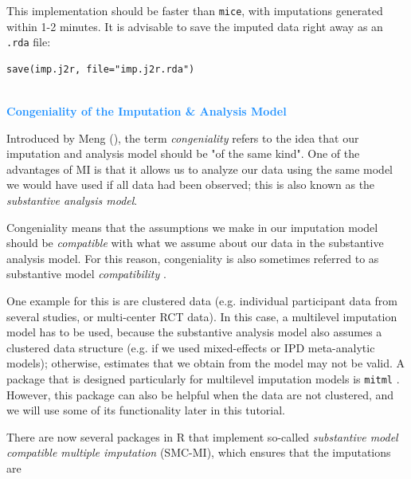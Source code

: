 This implementation should be faster than \texttt{mice}, with imputations generated within 1-2 minutes. It is advisable to save the imputed data right away as an \texttt{.rda} file:

\begin{lstlisting}
save(imp.j2r, file="imp.j2r.rda")
\end{lstlisting}

\begin{box-info} \\
\textcolor{dodgerblue}{\textbf{Congeniality of the Imputation \& Analysis Model}} 

\vspace{2mm}

Introduced by Meng (\citeyear{meng1994multiple}), the term \emph{congeniality} refers to the idea that our imputation and analysis model should be "of the same kind". One of the advantages of MI is that it allows us to analyze our data using the same model we would have used if all data had been observed; this is also known as the \emph{substantive analysis model}. 

\vspace{2mm}

\hspace*{5mm} Congeniality means that the assumptions we make in our imputation model should be \emph{compatible} with what we assume about our data in the substantive analysis model. For this reason, congeniality is also sometimes referred to as substantive model \emph{compatibility} \citep{bartlett2015multiple, quartagno2022substantive}. 

\vspace{2mm}

\hspace*{5mm} One example for this is are clustered data (e.g. individual participant data from several studies, or multi-center RCT data). In this case, a multilevel imputation model has to be used, because the substantive analysis model also assumes a clustered data structure (e.g. if we used mixed-effects or IPD meta-analytic models); otherwise, estimates that we obtain from the model may not be valid. A package that is designed particularly for multilevel imputation models is \texttt{mitml} \citep{mitml}. However, this package can also be helpful when the data are not clustered, and we will use some of its functionality later in this tutorial. 

\vspace{2mm}

\hspace*{5mm} There are now several packages in \textsf{R} that implement so-called \emph{substantive model compatible multiple imputation} (SMC-MI), which ensures that the imputations are

\end{box-info}
